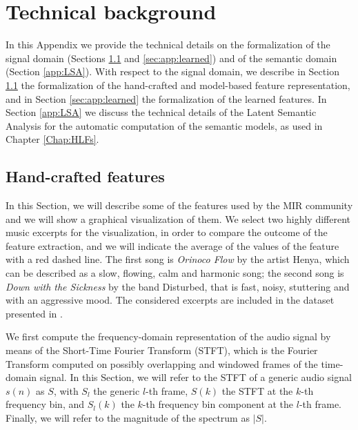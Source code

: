 \chapter{Technical background}
In this Appendix we provide the technical details on the formalization of the signal domain (Sections \ref{app:LLFs} and \ref{sec:app:learned}) and of the semantic domain (Section \ref{app:LSA}). With respect to the signal domain, we describe in Section \ref{app:LLFs} the formalization of the hand-crafted and model-based feature representation, and in Section \ref{sec:app:learned} the formalization of the learned features. In Section \ref{app:LSA} we discuss the technical details of the Latent Semantic Analysis for the automatic computation of the semantic models, as used in Chapter \ref{Chap:HLFs}. 

\section{Hand-crafted features}\label{app:LLFs}
In this Section, we will describe some of the features used by the MIR community and we will show a graphical visualization of them. We select two highly different music excerpts for the visualization, in order to compare the outcome of the feature extraction, and we will indicate the average of the values of the feature with a red dashed line. The first song is \textit{Orinoco Flow} by the artist Henya, which can be described as a slow, flowing, calm and harmonic song; the second song is \textit{Down with the Sickness} by the band Disturbed, that is fast, noisy, stuttering \cite{Buccoli2013} and with an aggressive mood. The considered excerpts are included in the dataset presented in \cite{kim2008moodswings}.

We first compute the frequency-domain representation of the audio signal by means of the Short-Time Fourier Transform (STFT), which is the Fourier Transform computed on possibly overlapping and windowed frames of the time-domain signal. In this Section, we will refer to the STFT of a generic audio signal $s(n)$ as $S$, with $S_l$ the generic $l$-th frame, $S(k)$ the STFT at the $k$-th frequency bin, and $S_l(k)$ the $k$-th frequency bin component at the $l$-th frame. Finally, we will refer to the magnitude of the spectrum as $|S|$.%

